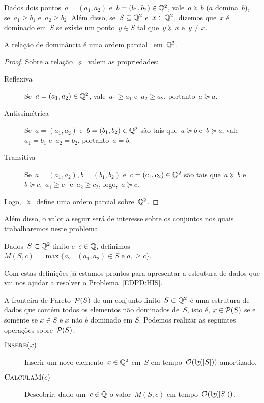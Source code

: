 \begin{defi}
Dados dois pontos~$a = (a_1,a_2)$ e~$b = (b_1,b_2) \in \mathbb{Q}^2$, vale~$a \succeq b$ ($a$ domina~$b$), se~$a_1 \geq b_1$ e~$a_2 \geq b_2$. Além disso, se~$S \subseteq \mathbb{Q}^2$ e~$x \in \mathbb{Q}^2$, dizemos que~$x$ é dominado em~$S$ se existe um ponto~$y \in S$ tal que~$y \succeq x$ e~$y \neq x$.
\end{defi}

\begin{prop}
A relação de dominância é uma ordem parcial~\cite[Apêndice B]{CLRS} em~$\mathbb{Q}^2$.
\end{prop}
\begin{proof}
Sobre a relação~$\succeq$ valem as propriedades:
\begin{description}
\item[Reflexiva] Se~$a = (a_1,a_2) \in \mathbb{Q}^2$, vale~$a_1 \geq a_1$ e~$a_2 \geq a_2$, portanto~$a \succeq a$.
\item[Antissimétrica] Se~$a = (a_1,a_2)$ e~$b = (b_1,b_2) \in \mathbb{Q}^2$ são tais que~$a \succeq b$ e~$b \succeq a$, vale~$a_1 = b_1$ e~$a_2 = b_2$, portanto~$a = b$.
\item[Transitiva] Se~$a = (a_1,a_2), b = (b_1,b_2)$ e~$c = (c_1,c_2) \in \mathbb{Q}^2$ são tais que~$a \succeq b$ e~$b \succeq c$,~$a_1 \geq c_1$ e~$a_2 \geq c_2$, logo,~$a \succeq c$.
\end{description}
Logo,~$\succeq$ define uma ordem parcial sobre~$\mathbb{Q}^2$.
\end{proof}

Além disso, o valor a seguir será de interesse sobre os conjuntos nos quais trabalharemos neste problema.
\begin{defi}
Dados~$S \subset \mathbb{Q}^2$ finito e~$c \in \mathbb{Q}$, definimos~${M(S,c) = \max\{a_2 \mid (a_1,a_2) \in S \text{ e } a_1 \geq c\}}$.
\end{defi}

Com estas definições já estamos prontos para apresentar a estrutura de dados que vai nos ajudar a resolver o Problema~\ref{EDPD:HIS}.
\begin{defi} \label{EDPD:Pareto}
A fronteira de Pareto~$\mathcal{P}(S)$ de um conjunto finito~$S \subset \mathbb{Q}^2$ é uma estrutura de dados que contém todos os elementos não dominados de~$S$, isto é, $x \in \mathcal{P}(S)$ se e somente se $x \in S$ e $x$ não é dominado em $S$. Podemos realizar as seguintes operações sobre~$\mathcal{P}(S)$:

\begin{description}
\item[$\textsc{Insere}(x)$] Inserir um novo elemento~$x \in \mathbb{Q}^2$ em~$S$ em tempo~$\mathcal{O}(\lg(|S|))$ amortizado.
\item[$\textsc{CalculaM}(c)$] Descobrir, dado um~$c \in \mathbb{Q}$ o valor~$M(S,c)$ em tempo~$\mathcal{O}(\lg(|S|))$.
\end{description}
\end{defi}

